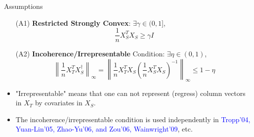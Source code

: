 \documentclass[slidestop,compress,9pt,epsfig,color]{beamer}
\theoremstyle{example}
\providecommand{\subitem}{\\ \textcolor{yellow}{$\bullet\ $}}
\begin{document}



\begin{frame}{Assumptions}
\begin{itemize}
\item[(A1)] \textbf{Restricted Strongly Convex}: $\exists\gamma\in (0,1]$,
$$  \frac{1}{n} X^T_S X_S \geq \gamma I  $$
\item[(A2)] \textbf{Incoherence/Irrepresentable} Condition: $\exists \eta \in (0,1)$,
\[ \left\|\frac{1}{n} X^T_T X_S^{\dagger} \right \|_\infty = \left\|\frac{1}{n} X^T_T X_S \left ( \frac{1}{n} X^T_S X_S \right )^{-1} \right \|_\infty \leq 1 - \eta \]
\end{itemize}
\begin{itemize}
\item "Irrepresentable" means that one can not represent (regress) column vectors in $X_T$ by covariates in $X_S$.
\item The incoherence/irrepresentable condition is used independently in \textcolor{blue}{Tropp'04, Yuan-Lin'05, Zhao-Yu'06, and Zou'06, Wainwright'09}, etc.
\end{itemize}
\end{frame}
\end{document}

